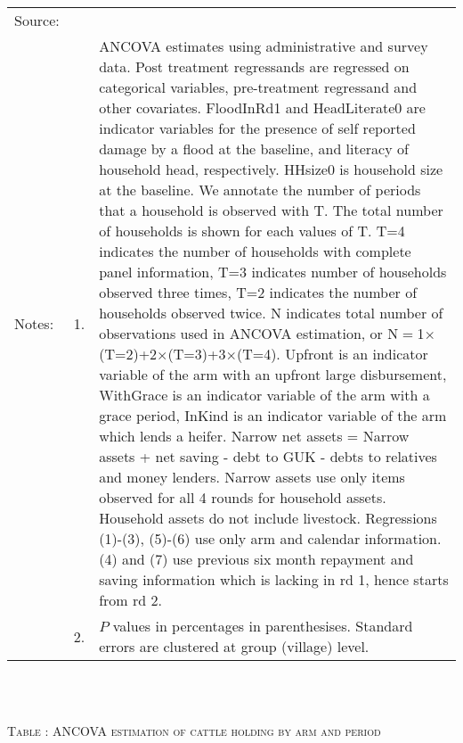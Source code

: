 \begin{minipage}[t]{14cm}
\renewcommand{\arraystretch}{.8}
\setlength{\tabcolsep}{1pt} \begin{tabular}{>{\hfill\scriptsize}p{1cm}<{}>{\hfill\scriptsize}p{.25cm}<{}>{\scriptsize}p{12cm}<{\hfill}} 
Source:& \multicolumn{2}{l}{\scriptsize Estimated with GUK administrative and survey data.}\\
Notes: & 1. & ANCOVA estimates using administrative and survey data. Post treatment regressands are regressed on categorical variables, pre-treatment regressand and other covariates. \textsf{FloodInRd1} and \textsf{HeadLiterate0} are indicator variables for the presence of self reported damage by a flood at the baseline, and literacy of household head, respectively. \textsf{HHsize0} is household size at the baseline. We annotate the number of periods that a household is observed with \textsf{T}. The total number of households is shown for each values of \textsf{T}. \textsf{T=4} indicates the number of households with complete panel information, \textsf{T=3} indicates number of households observed three times, \textsf{T=2} indicates the number of households observed twice. \textsf{N} indicates total number of observations used in ANCOVA estimation, or \textsf{N$=$1$\times$(T=2)+2$\times$(T=3)+3$\times$(T=4)}.  \textsf{Upfront} is an indicator variable of the arm with an upfront large disbursement, \textsf{WithGrace} is an indicator variable of the arm with a grace period, \textsf{InKind} is an indicator variable of the arm which lends a heifer. Narrow net assets = Narrow assets + net saving - debt to GUK - debts to relatives and money lenders. Narrow assets use only items observed for all 4 rounds for household assets. Household assets do not include livestock. Regressions (1)-(3), (5)-(6) use only arm and calendar information. (4) and (7) use previous six month repayment and saving information which is lacking in rd 1, hence starts from rd 2.\\
& 2. &  $P$ values in percentages in parenthesises. Standard errors are clustered at group (village) level. %
 \end{tabular}
\end{minipage} \\\\\hspace{-1cm}\begin{minipage}[t]{14cm} \hfil\textsc{\normalsize Table \thetable: ANCOVA estimation of cattle holding by arm and period\label{tab ANCOVA cow time varying}}\\ \setlength{\tabcolsep}{1pt}

\end{minipage}
